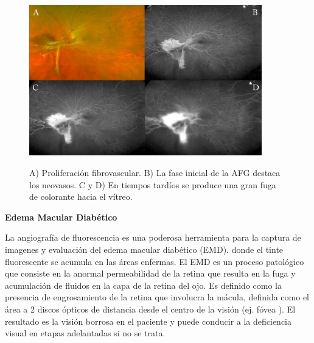 \begin{figure}[H]
\centering
\includegraphics[width=0.9\textwidth]{./Figures/AF_HIPERNEOVASOS.png}
\label{fig:lightfilter}
\caption{A) Proliferación fibrovascular. B) La fase inicial de la AFG destaca los neovasos. C y D) En tiempos tardíos se produce una gran fuga de colorante hacia el vítreo.}
\end{figure}




\textbf{Edema Macular Diabético}

La angiografía de fluorescencia es una poderosa herramienta para la captura de imagenes y evaluación del edema macular diabético (EMD). donde el tinte fluorescente se acumula en las áreas enfermas.
El EMD es un proceso patológico que consiste en la anormal permeabilidad de la retina que resulta en la fuga y acumulación de fluidos en la capa de la retina del ojo. Es definido como la presencia de engrosamiento de la retina que involucra la mácula, definida como el área a 2 discos ópticos de distancia desde el centro de la visión (ej. fóvea ). El resultado es la visión borrosa en el paciente y puede conducir a la deficiencia visual en etapas adelantadas si no se trata. \cite{el2011segmentation}


